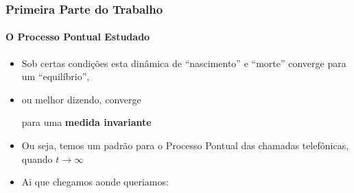 \documentclass[11pt]{beamer}
\theoremstyle{remark}
\theoremstyle{definition}
\theoremstyle{plain}
\begin{document}
    \begin{frame}
        \frametitle{Primeira Parte do Trabalho}
        \framesubtitle{O Processo Pontual Estudado}

        \begin{itemize}
            \item
                Sob certas condições esta dinâmica de ``nascimento''
                e ``morte'' converge para um ``equilíbrio'', \\[0.4cm]

            \item
                ou melhor dizendo, converge
                \begin{center}
                    para uma \textbf{medida invariante} \\[0.4cm]
                \end{center}

            \item
                Ou seja, temos um padrão para o Processo Pontual das
                chamadas telefônicas, quando $t \to \infty$ \\[0.4cm]

            \item
                Ai que chegamos aonde queriamos:

                \begin{figure}
                    \centering
                \end{figure}

        \end{itemize}
    \end{frame}
    
\end{document}
